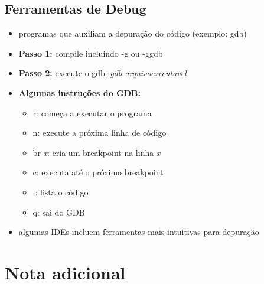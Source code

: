 \documentclass[portuguese,10pt,xcolor=table]{bredelebeamer}
\begin{document}
	\subsection{Ferramentas de Debug}
	\begin{frame}
		\begin{itemize}
			\item programas que auxiliam a depuração do código (exemplo: gdb)
			\item \textbf{Passo 1: } compile incluindo -g ou -ggdb
			\item \textbf{Passo 2: } execute o gdb: \textit{gdb arquivoexecutavel}
			\item \textbf{Algumas instruções do GDB: }
			\begin{itemize}
			\item r: começa a executar o programa
			\item n: execute a próxima linha de código
			\item br \textit{x}: cria um breakpoint na linha \textit{x}
			\item c: executa até o próximo breakpoint
			\item l: lista o código
			\item q: sai do GDB

			\end{itemize}
			\item algumas IDEs incluem ferramentas mais intuitivas para depuração
		\end{itemize}
	\end{frame}

	\section{Nota adicional}
\end{document}
